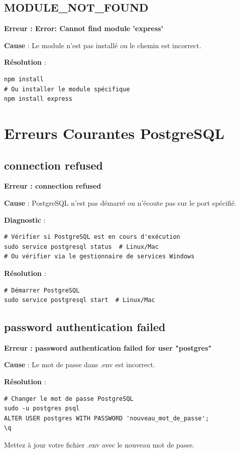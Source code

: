 \subsection{MODULE\_NOT\_FOUND}

\begin{errorbox}
    \textbf{Erreur : Error: Cannot find module 'express'}
    
    \textbf{Cause} : Le module n'est pas installé ou le chemin est incorrect.
    
    \textbf{Résolution} :
    \begin{lstlisting}[style=bash]
npm install
# Ou installer le module spécifique
npm install express
    \end{lstlisting}
\end{errorbox}

\section{Erreurs Courantes PostgreSQL}

\subsection{connection refused}

\begin{errorbox}
    \textbf{Erreur : connection refused}
    
    \textbf{Cause} : PostgreSQL n'est pas démarré ou n'écoute pas sur le port spécifié.
    
    \textbf{Diagnostic} :
    \begin{lstlisting}[style=bash]
# Vérifier si PostgreSQL est en cours d'exécution
sudo service postgresql status  # Linux/Mac
# Ou vérifier via le gestionnaire de services Windows
    \end{lstlisting}
    
    \textbf{Résolution} :
    \begin{lstlisting}[style=bash]
# Démarrer PostgreSQL
sudo service postgresql start  # Linux/Mac
    \end{lstlisting}
\end{errorbox}

\subsection{password authentication failed}

\begin{errorbox}
    \textbf{Erreur : password authentication failed for user "postgres"}
    
    \textbf{Cause} : Le mot de passe dans .env est incorrect.
    
    \textbf{Résolution} :
    \begin{lstlisting}[style=bash]
# Changer le mot de passe PostgreSQL
sudo -u postgres psql
ALTER USER postgres WITH PASSWORD 'nouveau_mot_de_passe';
\q
    \end{lstlisting}
    
    Mettez à jour votre fichier .env avec le nouveau mot de passe.
\end{errorbox}

